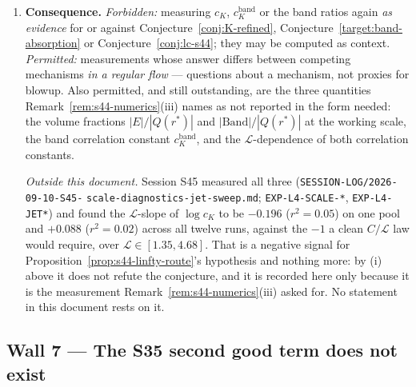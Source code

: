 \documentclass[11pt]{article}
\theoremstyle{definition}
\theoremstyle{remark}
\begin{document}
\begin{enumerate}[label=(\alph*),leftmargin=2.2em]
    conjectures. The ground is (i)--(ii): an observation about the
    \emph{form} of the statements --- each is conditional on a regime the
    solver cannot enter, and Proposition~\ref{prop:regime-A-impossible} is
    what ties that regime to genuine blowup. No new mathematics is required
    for it, and it does not depend on resolution, viscosity or initial
    condition. The diagnostic suite itself is \textsc{open} and valid for
    other purposes.
  \item \textbf{Consequence.} \emph{Forbidden:} measuring $c_K$,
    $c_K^{\mathrm{band}}$ or the band ratios again \emph{as evidence} for or
    against Conjecture~\ref{conj:K-refined},
    Conjecture~\ref{target:band-absorption} or
    Conjecture~\ref{conj:lc-s44}; they may be computed as context.
    \emph{Permitted:} measurements whose answer differs between competing
    mechanisms \emph{in a regular flow} --- questions about a mechanism, not
    proxies for blowup. Also permitted, and still outstanding, are the three
    quantities Remark~\ref{rem:s44-numerics}(iii) names as not reported in
    the form needed: the volume fractions $|E|/|Q(r^*)|$ and
    $|\mathrm{Band}|/|Q(r^*)|$ at the working scale, the band correlation
    constant $c_K^{\mathrm{band}}$, and the $\mathcal{L}$-dependence of both
    correlation constants.

    \emph{Outside this document.} Session S45 measured all three
    (\texttt{SESSION-LOG/}\allowbreak\texttt{2026-09-10-S45-}\allowbreak
    \texttt{scale-diagnostics-}\allowbreak\texttt{jet-sweep.md};
    \texttt{EXP-L4-SCALE-*}, \texttt{EXP-L4-JET*}) and found the
    $\mathcal{L}$-slope of $\log c_K$ to be $-0.196$ ($r^2=0.05$) on one pool
    and $+0.088$ ($r^2=0.02$) across all twelve runs, against the $-1$ a
    clean $C/\mathcal{L}$ law would require, over
    $\mathcal{L}\in[1.35,4.68]$. That is a negative signal for
    Proposition~\ref{prop:s44-linfty-route}'s hypothesis and nothing more:
    by (i) above it does not refute the conjecture, and it is recorded here
    only because it is the measurement Remark~\ref{rem:s44-numerics}(iii)
    asked for. No statement in this document rests on it.
\end{enumerate}

\subsection{Wall 7 --- The S35 second good term does not exist}
\label{subsec:wall7-w2}
\end{document}
